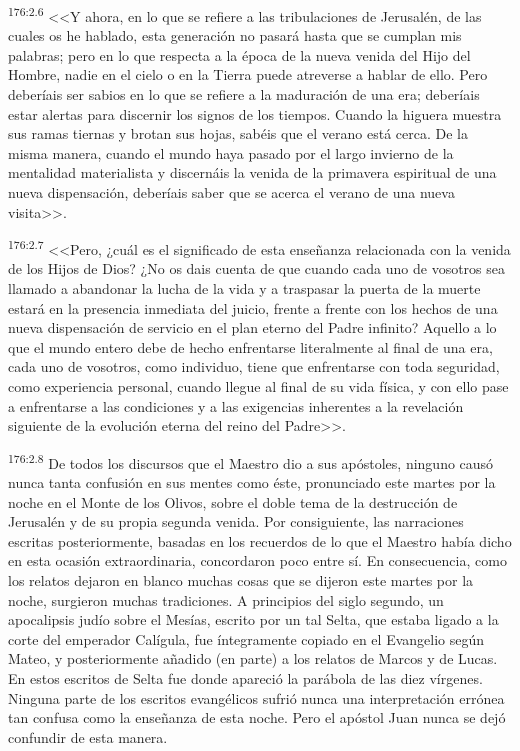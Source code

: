 \par 
\textsuperscript{176:2.6} <<Y ahora, en lo que se refiere a las tribulaciones de Jerusalén, de las cuales os he hablado, esta generación no pasará hasta que se cumplan mis palabras; pero en lo que respecta a la época de la nueva venida del Hijo del Hombre, nadie en el cielo o en la Tierra puede atreverse a hablar de ello. Pero deberíais ser sabios en lo que se refiere a la maduración de una era; deberíais estar alertas para discernir los signos de los tiempos. Cuando la higuera muestra sus ramas tiernas y brotan sus hojas, sabéis que el verano está cerca. De la misma manera, cuando el mundo haya pasado por el largo invierno de la mentalidad materialista y discernáis la venida de la primavera espiritual de una nueva dispensación, deberíais saber que se acerca el verano de una nueva visita>>.

\par 
\textsuperscript{176:2.7} <<Pero, ¿cuál es el significado de esta enseñanza relacionada con la venida de los Hijos de Dios? ¿No os dais cuenta de que cuando cada uno de vosotros sea llamado a abandonar la lucha de la vida y a traspasar la puerta de la muerte estará en la presencia inmediata del juicio, frente a frente con los hechos de una nueva dispensación de servicio en el plan eterno del Padre infinito? Aquello a lo que el mundo entero debe de hecho enfrentarse literalmente al final de una era, cada uno de vosotros, como individuo, tiene que enfrentarse con toda seguridad, como experiencia personal, cuando llegue al final de su vida física, y con ello pase a enfrentarse a las condiciones y a las exigencias inherentes a la revelación siguiente de la evolución eterna del reino del Padre>>.

\par 
\textsuperscript{176:2.8} De todos los discursos que el Maestro dio a sus apóstoles, ninguno causó nunca tanta confusión en sus mentes como éste, pronunciado este martes por la noche en el Monte de los Olivos, sobre el doble tema de la destrucción de Jerusalén y de su propia segunda venida. Por consiguiente, las narraciones escritas posteriormente, basadas en los recuerdos de lo que el Maestro había dicho en esta ocasión extraordinaria, concordaron poco entre sí. En consecuencia, como los relatos dejaron en blanco muchas cosas que se dijeron este martes por la noche, surgieron muchas tradiciones. A principios del siglo segundo, un apocalipsis judío sobre el Mesías, escrito por un tal Selta, que estaba ligado a la corte del emperador Calígula, fue íntegramente copiado en el Evangelio según Mateo, y posteriormente añadido (en parte) a los relatos de Marcos y de Lucas. En estos escritos de Selta fue donde apareció la parábola de las diez vírgenes. Ninguna parte de los escritos evangélicos sufrió nunca una interpretación errónea tan confusa como la enseñanza de esta noche. Pero el apóstol Juan nunca se dejó confundir de esta manera.

